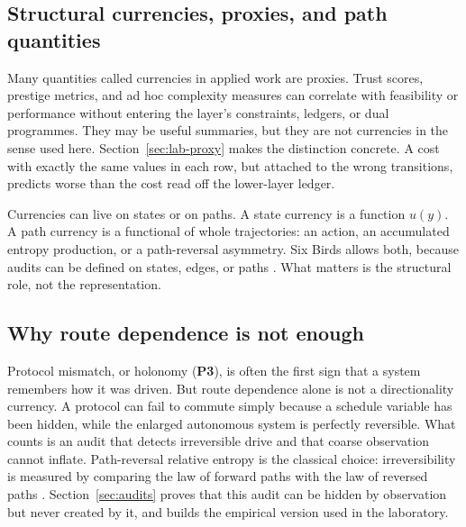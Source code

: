 \subsection{Structural currencies, proxies, and path quantities}

Many quantities called currencies in applied work are proxies. Trust scores, prestige metrics, and ad hoc complexity measures can correlate with feasibility or performance without entering the layer's constraints, ledgers, or dual programmes. They may be useful summaries, but they are not currencies in the sense used here. Section~\ref{sec:lab-proxy} makes the distinction concrete. A cost with exactly the same values in each row, but attached to the wrong transitions, predicts worse than the cost read off the lower-layer ledger.

Currencies can live on states or on paths. A state currency is a function \(u(y)\). A path currency is a functional of whole trajectories: an action, an accumulated entropy production, or a path-reversal asymmetry. Six Birds allows both, because audits can be defined on states, edges, or paths \cite{tsiokos2026sixbirds}. What matters is the structural role, not the representation.

\subsection{Why route dependence is not enough}

Protocol mismatch, or holonomy (\textbf{P3}), is often the first sign that a system remembers how it was driven. But route dependence alone is not a directionality currency. A protocol can fail to commute simply because a schedule variable has been hidden, while the enlarged autonomous system is perfectly reversible. What counts is an audit that detects irreversible drive and that coarse observation cannot inflate. Path-reversal relative entropy is the classical choice: irreversibility is measured by comparing the law of forward paths with the law of reversed paths \cite{kullback1951information,lebowitz1999gallavotti,seifert2005entropy}. Section~\ref{sec:audits} proves that this audit can be hidden by observation but never created by it, and builds the empirical version used in the laboratory.

